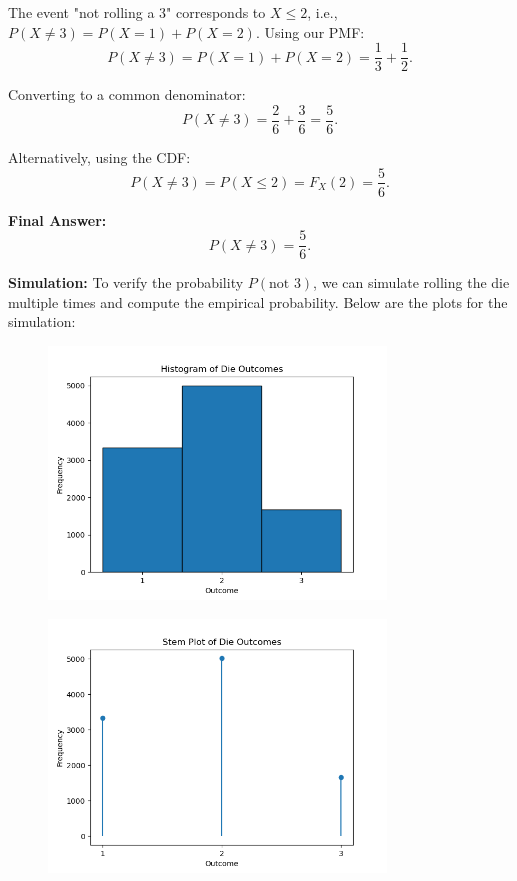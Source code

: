 \documentclass[journal]{IEEEtran}
\begin{document}
	The event "not rolling a 3" corresponds to \( X \leq 2 \), i.e., \( P(X \neq 3) = P(X = 1) + P(X = 2) \). Using our PMF:
	\[
	P(X \neq 3) = P(X = 1) + P(X = 2) = \frac{1}{3} + \frac{1}{2}.
	\]
	
	Converting to a common denominator:
	\[
	P(X \neq 3) = \frac{2}{6} + \frac{3}{6} = \frac{5}{6}.
	\]
	
	Alternatively, using the CDF:
	\[
	P(X \neq 3) = P(X \leq 2) = F_X(2) = \frac{5}{6}.
	\]
	
	\textbf{Final Answer:}
	\[P(X \neq 3) = \frac{5}{6}.\]
	
	
	\textbf{Simulation:}
	To verify the probability \( P(\text{not } 3) \), we can simulate rolling the die multiple times and compute the empirical probability. Below are the plots for the simulation:
	
	\begin{figure}[h]
	\centering
	\includegraphics[width=0.8\textwidth]{figs/fig.png}
	\end{figure}
	
	\begin{figure}[h]
		\centering
		\includegraphics[width=0.8\textwidth]{figs/fig2.png}
	\end{figure}
	
\end{document}

